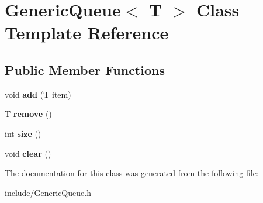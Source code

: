 \hypertarget{classGenericQueue}{}\section{Generic\+Queue$<$ T $>$ Class Template Reference}
\label{classGenericQueue}
\subsection*{Public Member Functions}
\begin{DoxyCompactItemize}
\item 
void {\bfseries add} (T item)\hypertarget{classGenericQueue_af5de20e93f3ee8d1fdd38a8ec1ae52f6}{}\label{classGenericQueue_af5de20e93f3ee8d1fdd38a8ec1ae52f6}

\item 
T {\bfseries remove} ()\hypertarget{classGenericQueue_a15366cdc3234d238c664c82524f14c0b}{}\label{classGenericQueue_a15366cdc3234d238c664c82524f14c0b}

\item 
int {\bfseries size} ()\hypertarget{classGenericQueue_aa94c712ca621ef5c121cd4f9c9188f67}{}\label{classGenericQueue_aa94c712ca621ef5c121cd4f9c9188f67}

\item 
void {\bfseries clear} ()\hypertarget{classGenericQueue_a0fd02ceeecaf5c0903e3ee7199b183bc}{}\label{classGenericQueue_a0fd02ceeecaf5c0903e3ee7199b183bc}

\end{DoxyCompactItemize}


The documentation for this class was generated from the following file\+:\begin{DoxyCompactItemize}
\item 
include/Generic\+Queue.\+h\end{DoxyCompactItemize}

